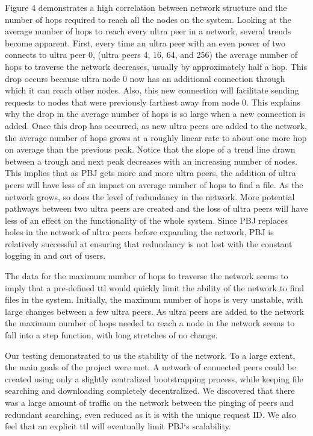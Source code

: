 \documentclass{acm_proc_article-sp}
\begin{document}
Figure 4 demonstrates a high correlation between network structure and the number of hops required to reach all the nodes on the system.  Looking at the average number of hops to reach every ultra peer in a network, several trends become apparent.  First, every time an ultra peer with an even power of two connects to ultra peer 0, (ultra peers 4, 16, 64, and 256) the average number of hops to traverse the network decreases, usually by approximately half a hop. This drop occurs because ultra node 0 now has an additional connection through which it can reach other nodes.  Also, this new connection will facilitate sending requests to nodes that were previously farthest away from node 0. This explains why the drop in  the average number of hops is so large when a new connection is added.  Once this drop has occurred, as new ultra peers are added to the network, the average number of hops grows at a roughly linear rate to about one more hop on average than the previous peak.  Notice that the slope of a trend line drawn between a trough and next peak decreases with an increasing number of nodes. This implies that as PBJ gets more and more ultra peers, the addition of ultra peers will have less of an impact on average number of hops to find a file. As the network grows, so does the level of redundancy in the network. More potential pathways between two ultra peers are created and the loss of ultra peers will have less of an effect on the functionality of the whole system.  Since PBJ replaces holes in the network of ultra peers before expanding the network, PBJ is relatively successful at ensuring that redundancy is not lost with the constant logging in and out of users.     


The data for the maximum number of hops to traverse the network seems to imply that a pre-defined ttl would quickly limit the ability of the network to find files in the system.  Initially, the maximum number of hops is very unstable, with large changes between a few ultra peers.  As ultra peers are added to the network the maximum number of hops needed to reach a node in the network seems to fall into a step function, with long stretches of no change.   

Our testing demonstrated to us the stability of the network. To a large extent, the main goals of the project were met. A network of connected peers could be created using only a slightly centralized bootstrapping process, while keeping file searching and downloading completely decentralized. We discovered that there was a large amount of traffic on the network between the pinging of peers and redundant searching, even reduced as it is with the unique request ID. We also feel that an explicit ttl will eventually limit PBJ`s scalability.
\end{document}
